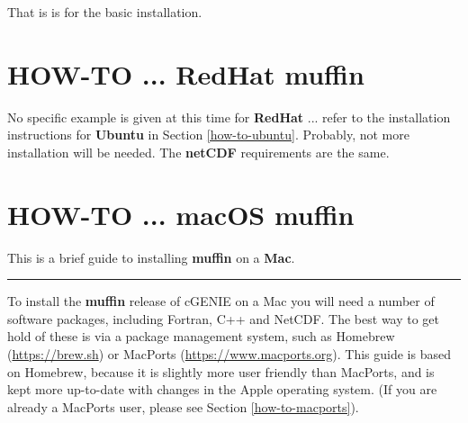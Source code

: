 \documentclass[11pt,fleqn]{book} %
\begin{document}
\noindent That is is for the basic installation.


\newpage


\section{HOW-TO ... RedHat muffin}\label{how-to-redhat}
\vspace{2mm}


No specific example is given at this time for \textbf{RedHat} ... refer to the installation instructions for \textbf{Ubuntu} in Section \ref{how-to-ubuntu}. Probably, not more installation will be needed. The \textbf{netCDF} requirements are the same.


\newpage


\section{HOW-TO ... macOS muffin}\label{how-to-macos}
\vspace{2mm}

This is a brief guide to installing \textbf{muffin} on a \textbf{Mac}. 

\vspace{1mm}
\noindent\rule{4cm}{0.1mm}
\vspace{2mm}

\noindent To install the \textbf{muffin} release of cGENIE on a Mac you will need a number of software packages, including Fortran, C++ and NetCDF. The best way to get hold of these is via a package management system, such as Homebrew (\href{}{https://brew.sh}) or MacPorts (\href{}{https://www.macports.org}). This guide is based on Homebrew, because it is slightly more user friendly than MacPorts, and is kept more up-to-date with changes in the Apple operating system. (If you are already a MacPorts user, please see Section \ref{how-to-macports}).
\end{document}
